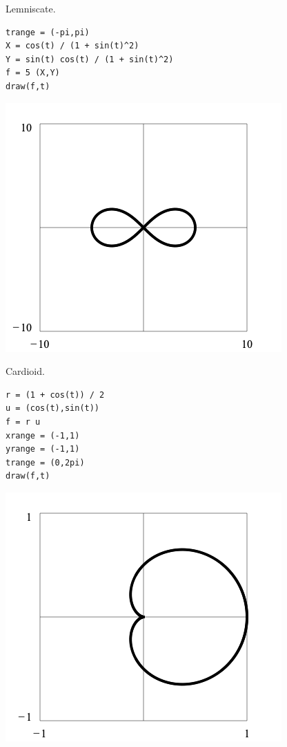 \noindent
Lemniscate.

{\color{blue}
\begin{verbatim}
trange = (-pi,pi)
X = cos(t) / (1 + sin(t)^2)
Y = sin(t) cos(t) / (1 + sin(t)^2)
f = 5 (X,Y)
draw(f,t)
\end{verbatim}
}

\begin{center}
\includegraphics[scale=0.5]{lemniscate.png}
\end{center}

\noindent
Cardioid.

{\color{blue}
\begin{verbatim}
r = (1 + cos(t)) / 2
u = (cos(t),sin(t))
f = r u
xrange = (-1,1)
yrange = (-1,1)
trange = (0,2pi)
draw(f,t)
\end{verbatim}
}

\begin{center}
\includegraphics[scale=0.5]{cardioid.png}
\end{center}
